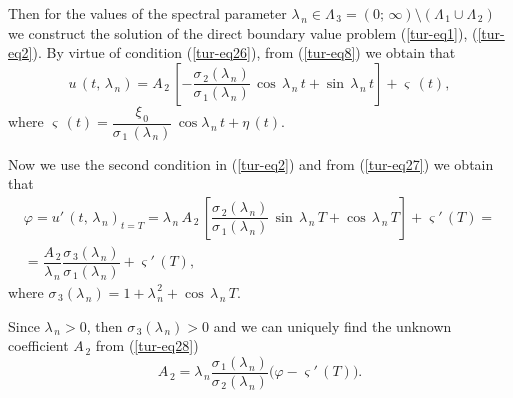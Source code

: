 ﻿\documentclass[
11pt,%
tightenlines,%
twoside,%
onecolumn,%
nofloats,%
nobibnotes,%
nofootinbib,%
superscriptaddress,%
noshowpacs,%
centertags]%
{revtex4}
\begin{document}
Then for the values of the spectral parameter $\lambda_{\, n} \in \Lambda_{\, 3}=(0 ; \, \infty) \setminus (\Lambda_{\, 1} \cup \Lambda_{\, 2})$ we construct the solution of the direct boundary value problem (\ref{tur-eq1}), (\ref{tur-eq2}). By virtue of condition (\ref{tur-eq26}), from (\ref{tur-eq8}) we obtain that 
\begin{equation} \label{tur-eq27}
u \, (t , \, \lambda_{\, n})=A_{\, 2} \, \left[ -\dfrac{\sigma_{\, 2} (\lambda_{\, n})}{\sigma_{\, 1} (\lambda_{\, n})} \, \cos \, \lambda_{\, n} \, t+\sin \, \lambda_{\, n} \, t \right]+\varsigma \, (t) ,
\end{equation}	
where $\varsigma \, (t)=\dfrac{\xi_{\, 0}}{\sigma_{\, 1} \, (\lambda_{\, n})} \, \cos \lambda_{\, n} \, t+\eta \, (t)$.

Now we use the second condition in  (\ref{tur-eq2}) and from (\ref{tur-eq27}) we obtain that 
\begin{multline} \label{tur-eq28}
\varphi=u ' \, (t , \, \lambda_{\, n})_{t=T}=\lambda_{\, n} \, A_{\, 2} \, \left[ \dfrac{\sigma_{\, 2} (\lambda_{\, n})}{\sigma_{\, 1} (\lambda_{\, n})} \, \sin \, \lambda_{\, n} \, T+\cos \, \lambda_{\, n} \, T \right]+\varsigma ' \, (T)=\\
 =\dfrac{A_{\, 2}}{\lambda_{\, n}}  \dfrac{\sigma_{\, 3} (\lambda_{\, n})}{\sigma_{\, 1} (\lambda_{\, n})}+\varsigma ' \, (T) ,
\end{multline}
where $\sigma_{\, 3} (\lambda_{\, n})=1+\lambda_{\, n}^{\, 2}+\cos \, \lambda_{\, n} \, T $. 

 Since $\lambda_{\, n}>0$, then $\sigma_{\, 3} (\lambda_{\, n})>0$ and we can uniquely find the unknown coefficient $A_{\, 2}$ from (\ref{tur-eq28})
\begin{equation} \label{tur-eq29}
 A_{\, 2}=\lambda_{\, n}  \dfrac{\sigma_{\, 1} (\lambda_{\, n})}{\sigma_{\, 2} (\lambda_{\, n})} \big( \varphi-\varsigma ' \, (T) \big)  .
\end{equation} 
 
\end{document}
